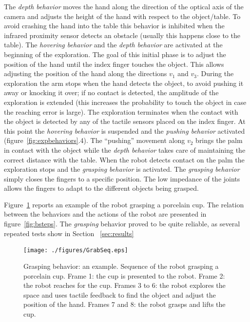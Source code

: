 The \emph{depth behavior} moves the hand along the direction of
the optical axis of the camera and adjusts the height of the hand
with respect to the object/table. To avoid crashing the hand into
the table this behavior is inhibited when the infrared proximity
sensor detects an obstacle (usually this happens close to the
table). The \emph{hovering behavior} and the \emph{depth behavior}
are activated at the beginning of the exploration. The goal of
this initial phase is to adjust the position of the hand until the
index finger touches the object. This allows adjusting the
position of the hand along the directions $v_1$ and $v_3$. During
the exploration the arm stops when the hand detects the object, to
avoid pushing it away or knocking it over; if no contact is
detected, the amplitude of the exploration is extended (this
increases the probability to touch the object in case the reaching
error is large). The exploration terminates when the contact with
the object is detected by any of the tactile sensors placed on the
index finger. At this point the \emph{hovering behavior} is
suspended and the \emph{pushing behavior} activated
(figure~\ref{fig:expbehaviors}.4). The ``pushing'' movement along
$v_2$ brings the palm in contact with the object while the
\emph{depth behavior} takes care of maintaining the correct
distance with the table. When the robot detects contact on the
palm the exploration stops and the \emph{grasping behavior} is
activated. The \emph{grasping behavior} simply closes the fingers
to a specific position. The low impedance of the joints allows the
fingers to adapt to the different objects being grasped.

Figure~\ref{fig:sequence} reports an example of the robot grasping
a porcelain cup. The relation between the behaviors and the
actions of the robot are presented in figure~\ref{fig:bsteps}. The
\emph{grasping} behavior proved to be quite reliable, as several
repeated tests show in Section~ \ref{sec:results}




\begin{figure}[htbp]
\centerline{
\texttt{[image: ./figures/GrabSeq.eps]}
} \caption[An example of the Grasping Behavior]{Grasping behavior:
an example. Sequence of the robot grasping a porcelain cup. Frame
1: the cup is presented to the robot. Frame 2: the robot reaches
for the cup. Frames 3 to 6: the robot explores the space and uses
tactile feedback to find the object and adjust the position of the
hand. Frames 7 and 8: the robot grasps and lifts the cup.}
\label{fig:sequence}
\end{figure}


